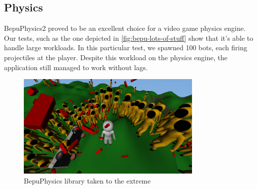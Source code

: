 \subsection{Physics}\label{subsec:physics}
BepuPhysics2 proved to be an excellent choice for a video game physics engine.
Our tests, such as the one depicted in \autoref{fig:bepu-lots-of-stuff} show that it's able to handle large workloads.
In this particular test, we spawned 100 bots, each firing projectiles at the player.
Despite this workload on the physics engine, the application still managed to work without lags.
\begin{figure}[!htb]
    \centering
    \includegraphics[width=0.8\textwidth]{chapters/results/sections/gameplay/resources/lots-of-stuff.png}
    \caption{BepuPhysics library taken to the extreme}
    \label{fig:bepu-lots-of-stuff}
\end{figure}